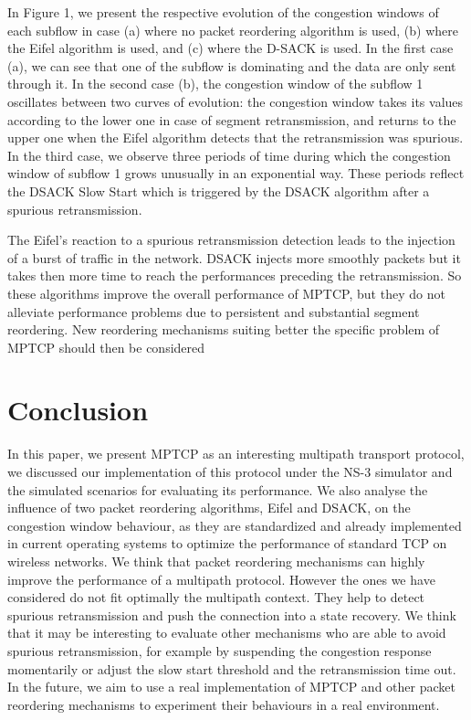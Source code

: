\documentclass[10pt,a4paper]{article}
\begin{document}
In Figure 1, we present the respective evolution of the congestion windows of each subflow in case (a) where no packet reordering algorithm is used, (b) where the Eifel algorithm is used, and (c) where the D-SACK is used. 
In the first case (a), we can see that one of the subflow is dominating and the data are only sent through it. 
In the second case (b), the congestion window of the subflow 1 oscillates between two curves of evolution: the congestion window takes its values according to the lower one in case of segment retransmission, and returns to the upper one when the Eifel algorithm detects that the retransmission was spurious. 
In the third case, we observe three periods of time during which the congestion window of subflow 1 grows unusually in an exponential way. These periods reflect the DSACK Slow Start which is triggered by the DSACK algorithm after a spurious retransmission.

The Eifel's reaction to a spurious retransmission detection leads to the injection of a burst of traffic in the network. DSACK injects more smoothly packets but it takes then more time to reach the performances preceding the retransmission. So these algorithms improve the overall performance of MPTCP, but they do not alleviate performance problems due to persistent and substantial segment reordering. New reordering mechanisms suiting better the specific problem of MPTCP should then be considered 


\section{Conclusion}
In this paper, we present MPTCP as an interesting multipath transport protocol, we discussed our implementation of this protocol under the NS-3 simulator and the simulated scenarios for evaluating its performance. We also analyse the influence of two packet reordering algorithms, Eifel and DSACK,  on the congestion window behaviour, as they are standardized and already implemented in current operating systems to optimize the performance of standard TCP on wireless networks. 
We think that packet reordering mechanisms can highly improve the performance of a multipath protocol. However the ones we have considered do not fit optimally the multipath context. They help to detect spurious retransmission and push the connection into a state recovery. We think that it may be interesting to evaluate other mechanisms who are able to avoid spurious retransmission, for example by suspending the congestion response momentarily or adjust the slow start threshold and the retransmission time out.
In the future, we aim to use a real implementation of MPTCP and other packet reordering mechanisms to experiment their behaviours in a real environment. 
\end{document}
